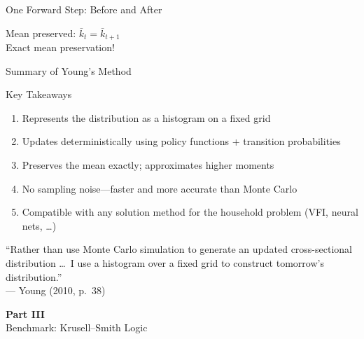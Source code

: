 \documentclass[aspectratio=169,11pt]{beamer}
\newcommand{\emphc}[1]{\textcolor{harvardcrimson}{#1}}
\begin{document}
\begin{frame}{One Forward Step: Before and After}
\vspace{0.3em}
\begin{center}
\tiny
Mean preserved: $\bar{k}_t = \bar{k}_{t+1}$\\[1pt]
\emphc{Exact mean preservation!}
\end{center}
\end{frame}

\begin{frame}{Summary of Young's Method}
\begin{block}{Key Takeaways}
\begin{enumerate}
    \item Represents the distribution as a \emphc{histogram} on a fixed grid
    \item Updates \emphc{deterministically} using policy functions + transition probabilities
    \item Preserves the \emphc{mean exactly}; approximates higher moments
    \item \emphc{No sampling noise}---faster and more accurate than Monte Carlo
    \item Compatible with \emphc{any} solution method for the household problem (VFI, neural nets, \ldots)
\end{enumerate}
\end{block}

\vspace{0.5em}
\begin{center}
{\small ``Rather than use Monte Carlo simulation to generate an updated cross-sectional distribution \ldots\ I use a histogram over a fixed grid to construct tomorrow's distribution.''\\
--- Young (2010, p.~38)}
\end{center}
\end{frame}


\begin{frame}{}
\vfill
\begin{center}
{\Huge \textcolor{uzhblue}{\textbf{Part III}}}\\[12pt]
{\LARGE Benchmark: Krusell--Smith Logic}
\end{center}
\vfill
\end{frame}
\end{document}

